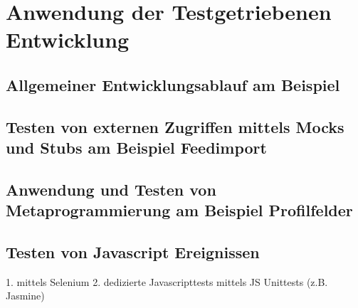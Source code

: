 \section{Anwendung der Testgetriebenen Entwicklung}
    \subsection{Allgemeiner Entwicklungsablauf am Beispiel}
    \subsection{Testen von externen Zugriffen mittels Mocks und Stubs am Beispiel Feedimport}
    \subsection{Anwendung und Testen von Metaprogrammierung am Beispiel Profilfelder}
    \subsection{Testen von Javascript Ereignissen}
      1. mittels Selenium
      2. dedizierte Javascripttests mittels JS Unittests (z.B. Jasmine)
